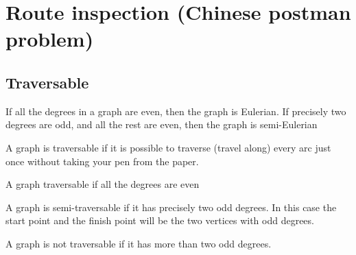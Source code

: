 \documentclass[a4paper]{article}
\begin{document}
\section{Route inspection (Chinese postman problem)}

\subsection{Traversable}

\begin{defi}[Eulerian]
	If all the degrees in a graph are even, then the graph is Eulerian. If precisely two degrees are odd, and all the rest are even, then the graph is semi-Eulerian
\end{defi}

\begin{defi}[Traversable]
	A graph is traversable if it is possible to traverse (travel along) every arc just once without taking your pen from the paper.

\end{defi}

\begin{prop}
	A graph traversable if all the degrees are even
\end{prop}

\begin{prop}
	A graph is semi-traversable if it has precisely two odd degrees. In this case the start point and the finish point will be the two vertices with odd degrees.
\end{prop}

\begin{prop}
	A graph is not traversable if it has more than two odd degrees.
\end{prop}

\begin{eg}

\end{eg}

\begin{eg}

\end{eg}

\begin{eg}

\end{eg}
\end{document}
